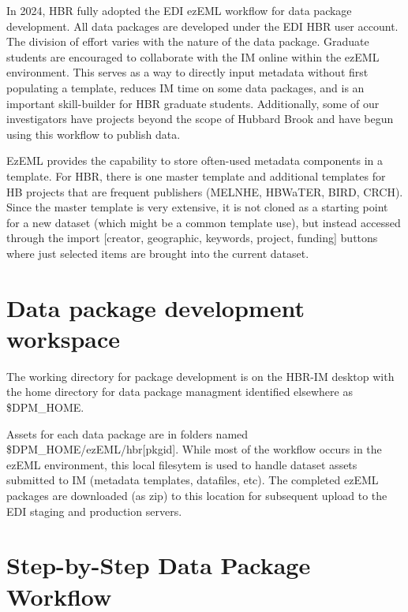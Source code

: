 \documentclass[
  letterpaper,
  DIV=11,
  numbers=noendperiod]{scrreprt}
\begin{document}
In 2024, HBR fully adopted the EDI ezEML workflow for data package
development. All data packages are developed under the EDI HBR user
account. The division of effort varies with the nature of the data
package. Graduate students are encouraged to collaborate with the IM
online within the ezEML environment. This serves as a way to directly
input metadata without first populating a template, reduces IM time on
some data packages, and is an important skill-builder for HBR graduate
students. Additionally, some of our investigators have projects beyond
the scope of Hubbard Brook and have begun using this workflow to publish
data.

EzEML provides the capability to store often-used metadata components in
a template. For HBR, there is one master template and additional
templates for HB projects that are frequent publishers (MELNHE, HBWaTER,
BIRD, CRCH). Since the master template is very extensive, it is not
cloned as a starting point for a new dataset (which might be a common
template use), but instead accessed through the import {[}creator,
geographic, keywords, project, funding{]} buttons where just selected
items are brought into the current dataset.

\section{Data package development
workspace}\label{data-package-development-workspace}

The working directory for package development is on the HBR-IM desktop
with the home directory for data package managment identified elsewhere
as \$DPM\_HOME.

Assets for each data package are in folders named
\$DPM\_HOME/ezEML/hbr{[}pkgid{]}. While most of the workflow occurs in
the ezEML environment, this local filesytem is used to handle dataset
assets submitted to IM (metadata templates, datafiles, etc). The
completed ezEML packages are downloaded (as zip) to this location for
subsequent upload to the EDI staging and production servers.

\section{Step-by-Step Data Package
Workflow}\label{step-by-step-data-package-workflow}
\end{document}
